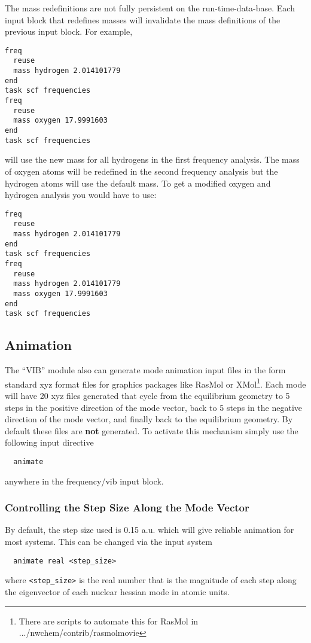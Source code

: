 The mass redefinitions are not fully persistent on the
run-time-data-base.  Each input block that redefines masses will
invalidate the mass definitions of the previous input block.
For example, 
\begin{verbatim}
freq
  reuse
  mass hydrogen 2.014101779
end
task scf frequencies
freq
  reuse
  mass oxygen 17.9991603
end
task scf frequencies
\end{verbatim}
will use the new mass for all hydrogens in the first frequency
analysis.  The mass of oxygen atoms will be redefined in the second
frequency analysis but the hydrogen atoms will use the default mass.
To get a modified oxygen and hydrogen analysis you would have to use:
\begin{verbatim}
freq
  reuse
  mass hydrogen 2.014101779
end
task scf frequencies
freq
  reuse
  mass hydrogen 2.014101779
  mass oxygen 17.9991603
end
task scf frequencies
\end{verbatim}

\subsection{Animation} 
The ``VIB'' module also can generate mode animation input files in the
form standard xyz format files for graphics packages like
RasMol or XMol\footnote{There are scripts to automate this for RasMol in
.../nwchem/contrib/rasmolmovie}.  Each mode will have 20 xyz
files generated that cycle from the equilibrium geometry to 5 steps in
the positive direction of the mode vector, back to 5 steps in the
negative direction of the mode vector, and finally back to the
equilibrium geometry.  By default these files are {\bf not} generated.
To activate this mechanism simply use the following input directive 
\begin{verbatim}
  animate
\end{verbatim}
anywhere in the frequency/vib input block.
\subsubsection{Controlling the Step Size Along the Mode Vector}
By default, the step size used is 0.15 a.u. which will give reliable
animation for most systems.  This can be changed via the input system
\begin{verbatim}
  animate real <step_size>
\end{verbatim}
where \verb+<step_size>+ is the real number that is the magnitude of
each step along the eigenvector of each nuclear hessian mode in atomic
units.

